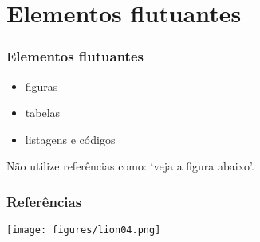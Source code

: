 \documentclass[10pt,notes,compress,aspectratio=169]{beamer}
\begin{document}


















\section{Elementos flutuantes}

\begin{frame}
\frametitle{Elementos flutuantes}
\begin{itemize}
\item figuras
\item tabelas
\item listagens e códigos
\end{itemize}

\vspace{3ex}
Não utilize referências como:  `veja a figura abaixo'.
\end{frame}







\begin{frame}[allowframebreaks]
\frametitle{Referências}
\printbibliography

\vspace{3ex}
\begin{flushright}
\texttt{[image: figures/lion04.png]}
\end{flushright}
\end{frame}


\end{document}
